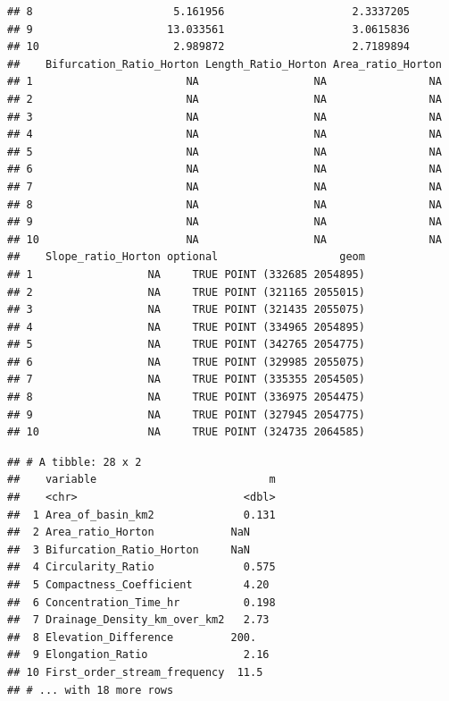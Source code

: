 \documentclass[11pt,]{article}
\newenvironment{Shaded}{\begin{snugshade}}{\end{snugshade}}
\newcommand{\KeywordTok}[1]{\textcolor[rgb]{0.13,0.29,0.53}{\textbf{#1}}}
\newcommand{\DataTypeTok}[1]{\textcolor[rgb]{0.13,0.29,0.53}{#1}}
\newcommand{\StringTok}[1]{\textcolor[rgb]{0.31,0.60,0.02}{#1}}
\newcommand{\OperatorTok}[1]{\textcolor[rgb]{0.81,0.36,0.00}{\textbf{#1}}}
\newcommand{\NormalTok}[1]{#1}
\begin{document}
\begin{verbatim}
## 8                      5.161956                    2.3337205
## 9                     13.033561                    3.0615836
## 10                     2.989872                    2.7189894
##    Bifurcation_Ratio_Horton Length_Ratio_Horton Area_ratio_Horton
## 1                        NA                  NA                NA
## 2                        NA                  NA                NA
## 3                        NA                  NA                NA
## 4                        NA                  NA                NA
## 5                        NA                  NA                NA
## 6                        NA                  NA                NA
## 7                        NA                  NA                NA
## 8                        NA                  NA                NA
## 9                        NA                  NA                NA
## 10                       NA                  NA                NA
##    Slope_ratio_Horton optional                   geom
## 1                  NA     TRUE POINT (332685 2054895)
## 2                  NA     TRUE POINT (321165 2055015)
## 3                  NA     TRUE POINT (321435 2055075)
## 4                  NA     TRUE POINT (334965 2054895)
## 5                  NA     TRUE POINT (342765 2054775)
## 6                  NA     TRUE POINT (329985 2055075)
## 7                  NA     TRUE POINT (335355 2054505)
## 8                  NA     TRUE POINT (336975 2054475)
## 9                  NA     TRUE POINT (327945 2054775)
## 10                 NA     TRUE POINT (324735 2064585)
\end{verbatim}

\begin{Shaded}
\end{Shaded}

\begin{verbatim}
## # A tibble: 28 x 2
##    variable                           m
##    <chr>                          <dbl>
##  1 Area_of_basin_km2              0.131
##  2 Area_ratio_Horton            NaN    
##  3 Bifurcation_Ratio_Horton     NaN    
##  4 Circularity_Ratio              0.575
##  5 Compactness_Coefficient        4.20 
##  6 Concentration_Time_hr          0.198
##  7 Drainage_Density_km_over_km2   2.73 
##  8 Elevation_Difference         200.   
##  9 Elongation_Ratio               2.16 
## 10 First_order_stream_frequency  11.5  
## # ... with 18 more rows
\end{verbatim}
\end{document}
